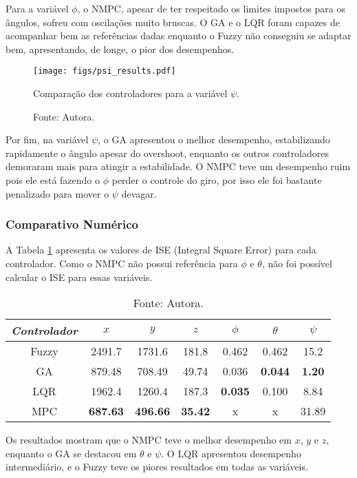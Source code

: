 Para a variável $\phi$, o NMPC, apesar de ter respeitado os limites impostos para os ângulos, 
sofreu com oscilações muito bruscas. O GA e o LQR foram capazes de acompanhar bem as referências dadas 
enquanto o Fuzzy não conseguiu se adaptar bem, apresentando, de longe, o pior dos desempenhos.
\begin{figure}[h!]
    \centering
    \texttt{[image: figs/psi\_results.pdf]} \vspace{-0.3cm}
    \caption{Comparação dos controladores para a variável $\psi$.}
    \vspace{-0.5cm} \caption*{\footnotesize{Fonte: Autora.}} \vspace{-0.7cm}
    \label{fig:psi_results}
\end{figure}

Por fim, na variável $\psi$, o GA apresentou o melhor desempenho, estabilizando rapidamente o ângulo 
apesar do overshoot, enquanto os outros controladores demoraram mais para atingir a estabilidade.
O NMPC teve um desempenho ruim pois ele está fazendo o $\phi$ perder o controle do giro, por isso
ele foi bastante penalizado para mover o $\psi$ devagar.

\subsubsection{Comparativo Numérico}
A Tabela \ref{tab:ise} apresenta os valores de ISE (Integral Square Error) para cada controlador. 
Como o NMPC não possui referência para $\phi$ e $\theta$, não foi possível calcular o ISE para essas variáveis.
\vspace{-0.5cm}
\begin{center}
    \begin{longtable}{|c|c|c|c|c|c|c|}
        \caption{Valores de ISE para diferentes controladores.} \vspace{-0.4cm}
        \label{tab:ise}
        \hline
        \emph{Controlador} & $x$ & $y$ & $z$ & $\phi$ & $\theta$ & $\psi$ \\ 
        \hline
        \endfirsthead
        \endhead
        \endfoot
        \caption*{\footnotesize{Fonte: Autora.}} \vspace{-2cm}
        \endlastfoot

        Fuzzy       & 2491.7  & 1731.6  & 181.8  & 0.462  & 0.462   & 15.2   \\ \hline
        GA          & 879.48  & 708.49  & 49.74  & 0.036  & \textbf{0.044}   & \textbf{1.20}   \\ \hline
        LQR         & 1962.4  & 1260.4  & 187.3  & \textbf{0.035}  & 0.100   & 8.84   \\ \hline
        MPC         & \textbf{687.63}  & \textbf{496.66}  & \textbf{35.42}  & x         & x    & 31.89   \\ \hline
    \end{longtable}
\end{center}

Os resultados mostram que o NMPC teve o melhor desempenho em $x$, $y$ e $z$, enquanto o GA se destacou em $\theta$ e $\psi$. 
O LQR apresentou desempenho intermediário, e o Fuzzy teve os piores resultados em todas as variáveis.